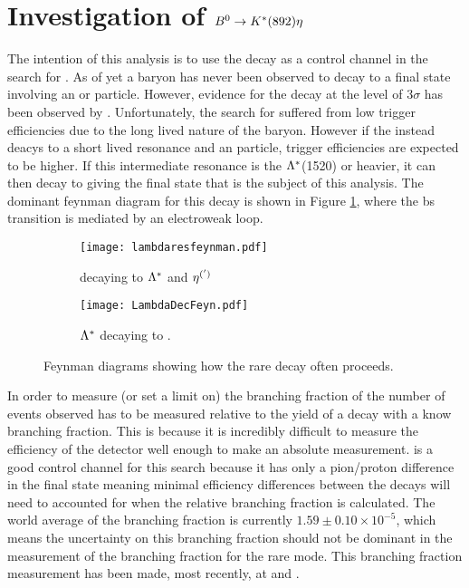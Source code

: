 \section{Investigation of ${{B}^0} \rightarrow {\ensuremath{{K}^*}}(892) \eta$}
\label{sec:Analysis}
The intention of this analysis is to use the decay \Bd \to \Kstar \etaz as a control channel in the search for \Lb \to \proton \Km \etaz.  As of yet a \Lb baryon has never been observed to decay to a final state involving an \etapr or \etaz particle.  However, evidence for the decay \Lb \to \Lz\etaz at the level of $3\sigma$ has been observed by \lhcb \cite{LHCb-PAPER-2015-019}. Unfortunately, the search for \Lb \to \Lz \etaz suffered from low trigger efficiencies due to the long lived nature of the \Lz baryon. However if the \Lb instead deacys to a short lived \Lz resonance and an \etaz particle, trigger efficiencies are expected to be higher.  If this intermediate resonance is the ${\Lambda}^{*}$(1520) or heavier, it can then decay to \proton \Km giving the final state that is the subject of this analysis.  The dominant feynman diagram for this decay is shown in Figure \ref{fig:Initial}, where the b\to s transition is mediated by an electroweak loop.
\begin{figure}[h]
  \centering
  \begin{subfigure}[b]{0.49\textwidth}
    \texttt{[image: lambdaresfeynman.pdf]}
    \caption{ \Lb decaying to ${\Lambda}^{*}$ and $\eta^{(')}$ }
    \label{fig:Initial}
  \end{subfigure}
  \begin{subfigure}[b]{0.49\textwidth}
    \texttt{[image: LambdaDecFeyn.pdf]}
    \caption{${\Lambda}^{*}$ decaying to \proton \Km.}
    \label{fig:next}
  \end{subfigure}
  \label{fig:feynman}
  \caption{Feynman diagrams showing how the rare decay often proceeds.}
  \end{figure}

In order to measure (or set a limit on) the branching fraction of \Lb \to \proton \Km the number of events observed has to be measured relative to the yield of a decay with a know branching fraction.  This is because it is incredibly difficult to measure the efficiency of the detector well enough to make an absolute measurement.  \Bd \to \Kstar \etaz is a good control channel for this search because it has only a pion/proton difference in the final state meaning minimal efficiency differences between the decays will need to accounted for when the relative branching fraction is calculated.  The world average of the branching fraction is currently $1.59\pm0.10 \times10^{-5}$, which means the uncertainty on this branching fraction should not be dominant in the measurement of the branching fraction for the rare mode.  This branching fraction measurement has been made, most recently, at  \babar and \belle\cite{Wang:2007rzb,Aubert:2006fj}.

